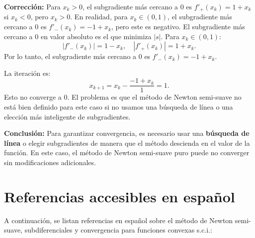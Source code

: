 \documentclass[12pt]{book}
\theoremstyle{definition}
\theoremstyle{plain}
\theoremstyle{remark}
\begin{document}
\medskip
\textbf{Corrección:} Para \( x_k > 0 \), el subgradiente más cercano a \( 0 \) es \( f'_+(x_k) = 1 + x_k \) si \( x_k < 0 \), pero \( x_k > 0 \). En realidad, para \( x_k \in (0, 1) \), el subgradiente más cercano a \( 0 \) es \( f'_-(x_k) = -1 + x_k \), pero este es negativo. El subgradiente más cercano a \( 0 \) en valor absoluto es el que minimiza \( |s| \). Para \( x_k \in (0, 1) \):
\[
|f'_-(x_k)| = 1 - x_k, \quad |f'_+(x_k)| = 1 + x_k.
\]
Por lo tanto, el subgradiente más cercano a \( 0 \) es \( f'_-(x_k) = -1 + x_k \).

\medskip
La iteración es:
\[
x_{k+1} = x_k - \frac{-1 + x_k}{1} = 1.
\]
Esto no converge a \( 0 \). El problema es que el método de Newton semi-suave no está bien definido para este caso si no usamos una búsqueda de línea o una elección más inteligente de subgradientes.

\medskip
\textbf{Conclusión:} Para garantizar convergencia, es necesario usar una \textbf{búsqueda de línea} o elegir subgradientes de manera que el método descienda en el valor de la función. En este caso, el método de Newton semi-suave puro puede no converger sin modificaciones adicionales.

\section*{Referencias accesibles en español}

A continuación, se listan referencias en español sobre el método de Newton semi-suave, subdiferenciales y convergencia para funciones convexas s.c.i.:
\end{document}
